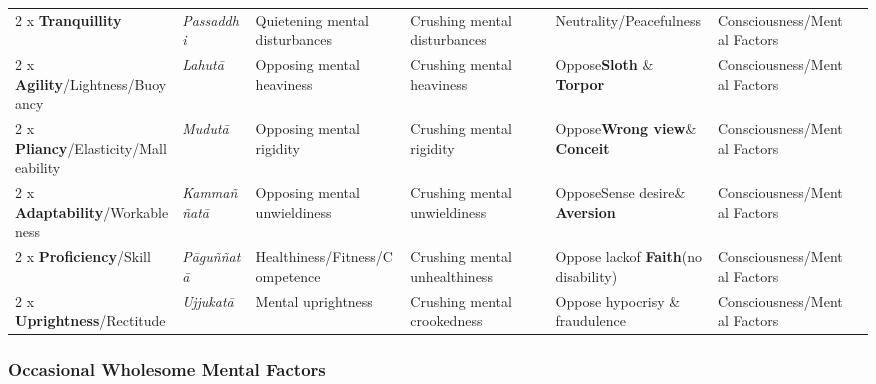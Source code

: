 \documentclass[a4 paper, 12pt]{article}
\begin{document}
\begin{tabular}{P{0.21\textwidth} | C{.13\textwidth} C{.165\textwidth} C{0.165\textwidth} C{0.165\textwidth} C{0.165\textwidth} m{0mm}}
2 x \textbf{Tranquillity} & \textit{Passaddhi} & Quietening mental disturbances & Crushing mental disturbances & Neutrality/\newline Peacefulness & Consciousness/\newline Mental Factors &\\[9mm]
2 x \textbf{Agility}/\newline Lightness/Buoyancy & \textit{Lahutā} & Opposing mental heaviness & Crushing mental heaviness & Oppose\newline \textbf{Sloth} \& \textbf{Torpor} & Consciousness/\newline Mental Factors &\\[9mm]
2 x \textbf{Pliancy}/\newline Elasticity/Malleability & \textit{Mudutā} & Opposing mental rigidity & Crushing mental rigidity & Oppose\newline \textbf{Wrong view}\newline \& \textbf{Conceit} & Consciousness/\newline Mental Factors &\\[9mm]
2 x \textbf{Adaptability}/\newline Workableness & \textit{Kammaññatā} & Opposing mental unwieldiness & Crushing mental unwieldiness & Oppose\newline Sense desire\newline \& \textbf{Aversion} & Consciousness/\newline Mental Factors &\\[9mm]
2 x \textbf{Proficiency}/\newline Skill & \textit{Pāguññatā} & Healthiness/\newline Fitness/\newline Competence & Crushing mental unhealthiness & Oppose lack\newline of \textbf{Faith}\newline (no disability) & Consciousness/\newline Mental Factors &\\[9mm]
2 x \textbf{Uprightness}/\newline Rectitude & \textit{Ujjukatā} & Mental uprightness & Crushing mental crookedness & Oppose hypocrisy \& fraudulence  & Consciousness/\newline Mental Factors &\\[9mm]
\bottomrule
\end{tabular} 

\newpage

\subsubsection*{Occasional Wholesome Mental Factors}
\end{document}
